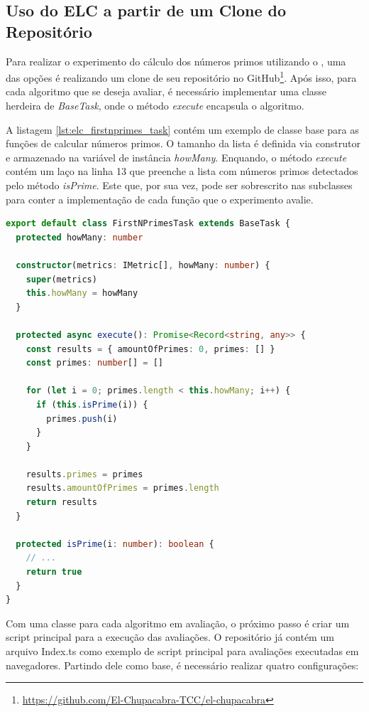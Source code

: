 \documentclass[12pt]{tcc}
\begin{document}
	\subsection{Uso do ELC a partir de um Clone do Repositório}
	\label{subsection:study-case-cloning-elc}

	Para realizar o experimento do cálculo dos números primos utilizando o , uma das opções é realizando um clone de seu repositório no GitHub\footnote{\url{https://github.com/El-Chupacabra-TCC/el-chupacabra}}.
	Após isso, para cada algoritmo que se deseja avaliar, é necessário implementar uma classe herdeira de \emph{BaseTask}, onde o método \emph{execute} encapsula o algoritmo.

	A listagem \ref{lst:elc_firstnprimes_task} contém um exemplo de classe base para as funções de calcular números primos.
	O tamanho da lista é definida via construtor e armazenado na variável de instância \emph{howMany}.
	Enquando, o método \emph{execute} contém um laço na linha 13 que preenche a lista com números primos detectados pelo método \emph{isPrime}.
	Este que, por sua vez, pode ser sobrescrito nas subclasses para conter a implementação de cada função que o experimento avalie.

\begin{lstlisting}[label={lst:elc_firstnprimes_task}, caption={Exemplo de classe encapulando um algoritmo de cálculo de números primos.}, language=TypeScript, breaklines=true]
export default class FirstNPrimesTask extends BaseTask {
  protected howMany: number

  constructor(metrics: IMetric[], howMany: number) {
    super(metrics)
    this.howMany = howMany
  }

  protected async execute(): Promise<Record<string, any>> {
    const results = { amountOfPrimes: 0, primes: [] }
    const primes: number[] = []

    for (let i = 0; primes.length < this.howMany; i++) {
      if (this.isPrime(i)) {
        primes.push(i)
      }
    }

    results.primes = primes
    results.amountOfPrimes = primes.length
    return results
  }

  protected isPrime(i: number): boolean {
    // ...
    return true
  }
}
\end{lstlisting}

	Com uma classe para cada algoritmo em avaliação, o próximo passo é criar um script principal para a execução das avaliações.
	O repositório já contém um arquivo Index.ts como exemplo de script principal para avaliações executadas em navegadores.
	Partindo dele como base, é necessário realizar quatro configurações:
\end{document}
